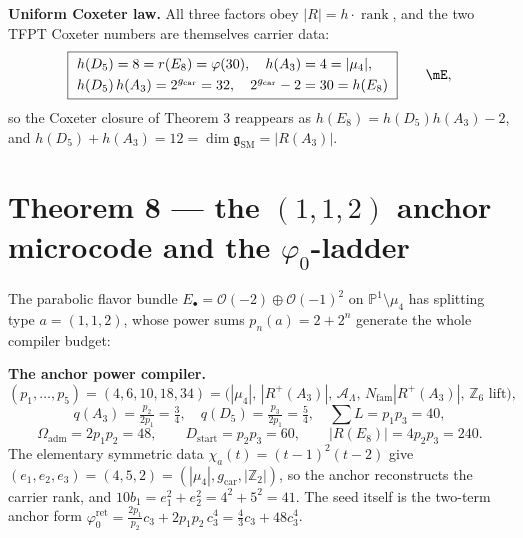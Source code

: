 \documentclass[11pt,a4paper]{article}
\newcommand{\gcar}{g_{\mathrm{car}}}
\newcommand{\Nfam}{N_{\mathrm{fam}}}
\newcommand{\Oadm}{\Omega_{\mathrm{adm}}}
\newcommand{\cthree}{c_3}
\newcommand{\phiz}{\varphi_0^{\mathrm{ret}}}
\newcommand{\AL}{\mathcal A_\Lambda}
\newcommand{\dimg}{\dim\mathfrak g_{\mathrm{SM}}}
\theoremstyle{definition}
\begin{document}
\noindent\textbf{Uniform Coxeter law.} All three factors obey $|R|=h\cdot\operatorname{rank}$, and the
two TFPT Coxeter numbers are themselves carrier data:
\begin{equation}
  \boxed{\ \begin{aligned}
    &h(D_5)=8=r(E_8)=\varphi(30),\quad h(A_3)=4=|\mu_4|,\\
    &h(D_5)\,h(A_3)=2^{\gcar}=32,\quad 2^{\gcar}-2=30=h(E_8)
  \end{aligned}\ }\qquad\mE ,
\end{equation}
so the Coxeter closure of Theorem 3 reappears as $h(E_8)=h(D_5)h(A_3)-2$, and
$h(D_5)+h(A_3)=12=\dimg=|R(A_3)|$.

\section*{Theorem 8 --- the $(1,1,2)$ anchor microcode and the $\varphi_0$-ladder}
\providecommand{\phiz}{\varphi_0^{\mathrm{ret}}}
The parabolic flavor bundle $E_\bullet=\mathcal O(-2)\oplus\mathcal O(-1)^2$ on $\mathbb P^1\setminus\mu_4$
has splitting type $a=(1,1,2)$, whose power sums $p_n(a)=2+2^n$ generate the whole compiler budget:

\par\medskip\noindent\textbf{The anchor power compiler.}
\[
  (p_1,\dots,p_5)=(4,6,10,18,34)=\bigl(|\mu_4|,\,|R^+(A_3)|,\,\AL,\,\Nfam|R^+(A_3)|,\,\text{$\mathbb Z_6$ lift}\bigr),
\]
\[
  q(A_3)=\tfrac{p_2}{2p_1}=\tfrac34,\quad q(D_5)=\tfrac{p_3}{2p_1}=\tfrac54,\quad \textstyle\sum L=p_1p_3=40,
\]
\[
  \Oadm=2p_1p_2=48,\qquad D_{\mathrm{start}}=p_2p_3=60,\qquad |R(E_8)|=4p_2p_3=240.
\]
The elementary symmetric data $\chi_a(t)=(t-1)^2(t-2)$ give $(e_1,e_2,e_3)=(4,5,2)=(|\mu_4|,\gcar,|\mathbb Z_2|)$,
so the anchor reconstructs the carrier rank, and $10b_1=e_1^2+e_2^2=4^2+5^2=41$. The seed itself is the
two-term anchor form $\phiz=\tfrac{2p_1}{p_2}\cthree+2p_1p_2\,\cthree^4=\tfrac43\cthree+48\cthree^4$.
\end{document}
